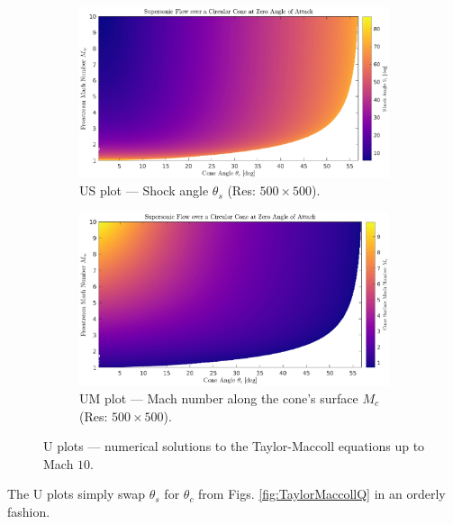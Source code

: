 \documentclass[11pt,dvipsnames]{thesis}
\begin{document}
\begin{figure}[H]
  \centering
  \begin{subfigure}[b]{\linewidth}
    \includegraphics[width=\linewidth]{TheTaylorMaccollGridOs500x500}
    \caption{US plot --- Shock angle $\theta_s$ (Res: $500 \times 500$).}%
    \label{fig:TaylorMaccollUS}
  \end{subfigure}
  \begin{subfigure}[b]{\linewidth}
    \includegraphics[width=\linewidth]{TheTaylorMaccollGridMc500x500}
    \caption{UM plot --- Mach number along the cone's surface $M_c$ (Res: $500 \times 500$).}%
    \label{fig:TaylorMaccollUM}
  \end{subfigure}
  \caption{U plots --- numerical solutions to the Taylor-Maccoll equations up to Mach $10$.}
  \label{fig:TaylorMaccollU}
\end{figure}
\noindent
The U plots simply swap $\theta_s$ for $\theta_c$ from Figs. \ref{fig:TaylorMaccollQ} in an orderly fashion. 
\end{document}
